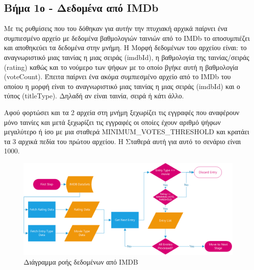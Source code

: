 \subsection{Βήμα 1ο - Δεδομένα από IMDb}
Με τις ρυθμίσεις που του
δόθηκαν για αυτήν την πτυχιακή αρχικά παίρνει
ένα συμπιεσμένο αρχείο με δεδομένα βαθμολογιών ταινιών από το IMDb το αποσυμπιέζει και αποθηκεύει τα δεδομένα στην μνήμη. Η Μορφή
δεδομένων του αρχείου είναι: το αναγνωριστικό μιας ταινίας η μιας σειράς (imdbId), η βαθμολογία της ταινίας/σειράς (rating) καθώς και το νούμερο των ψήφων με το οποίο βγήκε αυτή η βαθμολογία (voteCount). Έπειτα παίρνει ένα ακόμα συμπιεσμένο αρχείο από το IMDb του οποίου η μορφή
είναι το αναγνωριστικό μιας ταινίας η μιας σειράς (imdbId) και ο τύπος (titleType). Δηλαδή
αν είναι ταινία, σειρά ή κάτι άλλο. 

Αφού φορτώσει και τα 2 αρχεία στη μνήμη ξεχωρίζει τις εγγραφές που αναφέρουν μόνο ταινίες και μετά ξεχωρίζει τις εγγραφές οι οποίες έχουν αριθμό ψήφων μεγαλύτερο ή ίσο με μια σταθερά MINIMUM\_VOTES\_THRESHOLD και κρατάει τα 3 αρχικά πεδία του πρώτου αρχείου. Η Σταθερά αυτή για αυτό το σενάριο είναι 1000.

\begin{figure}[h]
  \centering
  \includegraphics[width=150mm]{Chapters/5 - Architecture/Import/Images/imdb_flowchart.png}
  \caption{Διάγραμμα ροής δεδομένων από IMDB}
  \label{flowchart:imdbImport}
\end{figure}